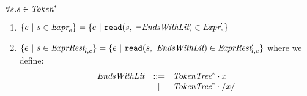\documentclass[preprint,10pt]{sigplanconf}
\begin{document}
\begin{theorem}\mbox{}

\(\forall s. s \in \textit{Token}^{*} \)
\begin{enumerate}
\item 
  \( 
  \{ e ~|~ s \in \textit{Expr}_{e} \} 
  =  
  \{ e ~|~ \texttt{read}(s,~\neg \textit{EndsWithLit}) \in \textit{Expr}'_{e}
  \}
  \)
\item \( 
  \{ e ~|~ s \in \textit{ExprRest}_{l, e} \}
  =
  \{ e ~|~ \texttt{read}(s,~\textit{EndsWithLit}) \in \textit{ExprRest}'_{l, e} \}
  \)
  where we define:
  \[
  \begin{array}{rcl}
    \textit{EndsWithLit} &::=& \textit{TokenTree}^{*}\cdot x
    \\
    &|& \textit{TokenTree}^{*} \cdot /x/ 
  \end{array}
  \]
\end{enumerate}
\end{theorem}
\end{document}
